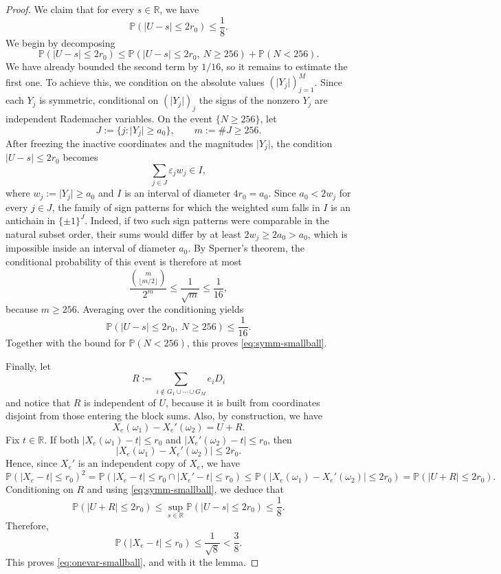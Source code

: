 \documentclass[11pt]{amsart}
\numberwithin{equation}{section}
\theoremstyle{definition}
\theoremstyle{remark}
\newcommand{\Prob}{\mathbb P}
\newcommand{\R}{\mathbb R}
\newcommand{\abs}[1]{\lvert #1 \rvert}
\begin{document}
\begin{proof}
We claim that for every $s\in\R$, we have
\begin{equation}\label{eq:symm-smallball}
\Prob(\abs{U-s}\le 2r_0)\le \frac18.
\end{equation}
We begin by decomposing
\[
\Prob(\abs{U-s}\le 2r_0)
\le
\Prob(\abs{U-s}\le 2r_0,\ N\ge256)+\Prob(N<256).
\]
We have already bounded the second term by $1/16$, so it remains to estimate
the first one.
To achieve this, we condition on the absolute values $(\abs{Y_j})_{j=1}^M$.  Since each $Y_j$ is
symmetric, conditional on $(\abs{Y_j})_j$ the signs of the nonzero $Y_j$ are
independent Rademacher variables.  On the event $\{N\ge256\}$, let
\[
J:=\{j:\abs{Y_j}\ge a_0\},
\qquad
m:=\#J\ge256.
\]
After freezing the inactive coordinates and the magnitudes $\abs{Y_j}$, the
condition $\abs{U-s}\le 2r_0$ becomes
\[
\sum_{j\in J}\varepsilon_j w_j \in I,
\]
where $w_j:=\abs{Y_j}\ge a_0$ and $I$ is an interval of diameter
$4r_0=a_0$.  Since $a_0<2w_j$ for every $j\in J$, the family of sign patterns
for which the weighted sum falls in $I$ is an antichain in $\{\pm1\}^J$.
Indeed, if two such sign patterns were comparable in the natural subset order,
their sums would differ by at least $2w_j\ge2a_0>a_0$, which is impossible
inside an interval of diameter $a_0$.  By Sperner's theorem, the conditional
probability of this event is therefore at most
\[
\frac{\binom{m}{\lfloor m/2\rfloor}}{2^m}
\le \frac1{\sqrt m}
\le \frac1{16},
\]
because $m\ge256$.  Averaging over the conditioning yields
\[
\Prob(\abs{U-s}\le 2r_0,\ N\ge256)\le \frac1{16}.
\]
Together with the bound for $\Prob(N<256)$, this proves
\eqref{eq:symm-smallball}.

 Finally, let
\[
R:=\sum_{i\notin G_1\cup\cdots\cup G_M} e_iD_i
\]
and notice that $R$ is independent of $U$, because it is built from coordinates disjoint
from those entering the block sums.  Also, by construction, we have
\[
X_e(\omega_1)-X_e'(\omega_2)=U+R.
\]
Fix $t\in\R$.  If both $\abs{X_e(\omega_1)-t}\le r_0$ and
$\abs{X_e'(\omega_2)-t}\le r_0$, then
\[
\abs{X_e(\omega_1)-X_e'(\omega_2)}\le 2r_0.
\]
Hence, since $X_{e}'$ is an independent copy of $X_e$, we have
\[
\Prob(\abs{X_e-t}\le r_0)^2 = \Prob(\abs{X_e-t}\le r_0\cap\abs{X_e'-t}\le r_0)
\le
\Prob(\abs{X_e(\omega_1)-X_e'(\omega_2)}\le 2r_0)
=
\Prob(\abs{U+R}\le 2r_0).
\]
Conditioning on $R$ and using \eqref{eq:symm-smallball}, we deduce that
\[
\Prob(\abs{U+R}\le 2r_0)
\le
\sup_{s\in\R}\Prob(\abs{U-s}\le 2r_0)
\le \frac18.
\]
Therefore,
\[
\Prob(\abs{X_e-t}\le r_0)\le \frac1{\sqrt8}<\frac38.
\]
This proves \eqref{eq:onevar-smallball}, and with it the lemma.
\end{proof}
\end{document}
